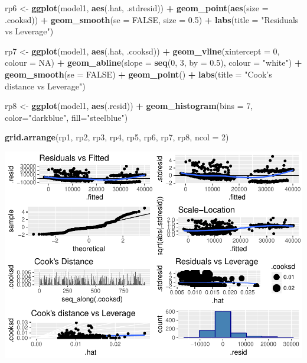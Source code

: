 \documentclass[]{article}
\newenvironment{Shaded}{\begin{snugshade}}{\end{snugshade}}
\newcommand{\KeywordTok}[1]{\textcolor[rgb]{0.13,0.29,0.53}{\textbf{#1}}}
\newcommand{\DataTypeTok}[1]{\textcolor[rgb]{0.13,0.29,0.53}{#1}}
\newcommand{\DecValTok}[1]{\textcolor[rgb]{0.00,0.00,0.81}{#1}}
\newcommand{\FloatTok}[1]{\textcolor[rgb]{0.00,0.00,0.81}{#1}}
\newcommand{\StringTok}[1]{\textcolor[rgb]{0.31,0.60,0.02}{#1}}
\newcommand{\OtherTok}[1]{\textcolor[rgb]{0.56,0.35,0.01}{#1}}
\newcommand{\OperatorTok}[1]{\textcolor[rgb]{0.81,0.36,0.00}{\textbf{#1}}}
\newcommand{\NormalTok}[1]{#1}
\begin{document}
\begin{Shaded}
\begin{Highlighting}[]
\NormalTok{rp6 <-}\StringTok{ }\KeywordTok{ggplot}\NormalTok{(model1, }\KeywordTok{aes}\NormalTok{(.hat, .stdresid)) }\OperatorTok{+}
\StringTok{  }\KeywordTok{geom_point}\NormalTok{(}\KeywordTok{aes}\NormalTok{(}\DataTypeTok{size =}\NormalTok{ .cooksd)) }\OperatorTok{+}
\StringTok{  }\KeywordTok{geom_smooth}\NormalTok{(}\DataTypeTok{se =} \OtherTok{FALSE}\NormalTok{, }\DataTypeTok{size =} \FloatTok{0.5}\NormalTok{) }\OperatorTok{+}
\StringTok{  }\KeywordTok{labs}\NormalTok{(}\DataTypeTok{title =} \StringTok{"Residuals vs Leverage"}\NormalTok{)}

\NormalTok{rp7 <-}\StringTok{ }\KeywordTok{ggplot}\NormalTok{(model1, }\KeywordTok{aes}\NormalTok{(.hat, .cooksd)) }\OperatorTok{+}
\StringTok{  }\KeywordTok{geom_vline}\NormalTok{(}\DataTypeTok{xintercept =} \DecValTok{0}\NormalTok{, }\DataTypeTok{colour =} \OtherTok{NA}\NormalTok{) }\OperatorTok{+}
\StringTok{  }\KeywordTok{geom_abline}\NormalTok{(}\DataTypeTok{slope =} \KeywordTok{seq}\NormalTok{(}\DecValTok{0}\NormalTok{, }\DecValTok{3}\NormalTok{, }\DataTypeTok{by =} \FloatTok{0.5}\NormalTok{), }\DataTypeTok{colour =} \StringTok{"white"}\NormalTok{) }\OperatorTok{+}
\StringTok{  }\KeywordTok{geom_smooth}\NormalTok{(}\DataTypeTok{se =} \OtherTok{FALSE}\NormalTok{) }\OperatorTok{+}
\StringTok{  }\KeywordTok{geom_point}\NormalTok{() }\OperatorTok{+}
\StringTok{  }\KeywordTok{labs}\NormalTok{(}\DataTypeTok{title =} \StringTok{"Cook's distance vs Leverage"}\NormalTok{)}

\NormalTok{rp8 <-}\StringTok{ }\KeywordTok{ggplot}\NormalTok{(model1, }\KeywordTok{aes}\NormalTok{(.resid)) }\OperatorTok{+}
\StringTok{  }\KeywordTok{geom_histogram}\NormalTok{(}\DataTypeTok{bins =} \DecValTok{7}\NormalTok{, }\DataTypeTok{color=}\StringTok{"darkblue"}\NormalTok{, }\DataTypeTok{fill=}\StringTok{"steelblue"}\NormalTok{)}

\KeywordTok{grid.arrange}\NormalTok{(rp1, rp2, rp3, rp4, rp5, rp6, rp7, rp8, }\DataTypeTok{ncol =} \DecValTok{2}\NormalTok{)}
\end{Highlighting}
\end{Shaded}

\includegraphics{DATA_605_Discussion_11_files/figure-latex/predict-plots-1.pdf}
\end{document}
